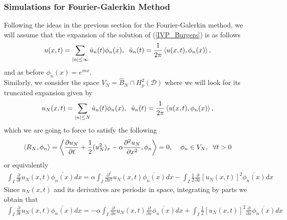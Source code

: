 	\subsubsection{Simulations for Fourier-Galerkin Method}
		
		Following the ideas in the previous section for the Fourier-Galerkin method, we will assume that the expansion of the solution of (\ref{IVP_Burgers}) is as follows
		\begin{align*}
			u(x, t) = \displaystyle \sum_{|n| \leq \infty} \hat{u}_n (t) \phi_n (x), \hspace{2mm} \hat{u}_n (t) = \frac{1}{2 \pi} \left\langle u (x, t), \phi_n (x) \right\rangle,  
		\end{align*}
		and as before $\phi_n (x) = e^{inx}$. \\
	
		Similarly, we consider the space $V_N = \hat{B}_N \cap H^2_p (\mathcal{D})$ where we will look for its truncated expansion given by
		\begin{align*}
			u_N (x, t) = \displaystyle \sum_{ |n| \leq N } \hat{u}_n (t) \phi_n (x), \hspace{2mm} \hat{u}_n (t) = \frac{1}{2 \pi} \left\langle u (x, t), \phi_n (x) \right\rangle, 
		\end{align*}  
		which we are going to force to satisfy the following
		\begin{align}
			\left\langle R_N, \phi_n \right\rangle = \left\langle \frac{\partial u_N}{\partial t} + \frac{1}{2} (u_N^2)_x - \alpha \frac{\partial^2 u_N}{\partial x^2}, \phi_n \right\rangle = 0, \hspace{2mm}  \hspace{2mm} \phi_n \in V_N, \hspace{2mm} \forall t > 0
		\end{align}
		or equivalently
		\begin{align*}
			\displaystyle \int_{I} \frac{\partial}{\partial t} u_N (x, t) \overline{\phi_n (x)} dx = \alpha \int_{I} \frac{\partial^2}{\partial x^2} u_N(x, t) \overline{\phi_n (x)} dx - \int_{I} \frac{1}{2} \frac{\partial}{\partial x} \left[ u_N(x, t) \right]^2 \overline{\phi_n (x)} dx   
		\end{align*}
		Since $u_N (x, t)$ and its derivatives are periodic in space, integrating by parts we obtain that
		\begin{align*}
			\displaystyle \int_{I} \frac{\partial}{\partial t} u_N (x, t) \overline{\phi_n (x)} dx = - \alpha \int_{I} \frac{\partial}{\partial x} u_N(x, t) \frac{\partial}{\partial x} \overline{\phi_n (x)} dx + \int_{I} \frac{1}{2} \left[ u_N(x, t) \right]^2 \frac{\partial}{\partial x} \overline{\phi_n (x)} dx   
		\end{align*} 
		
